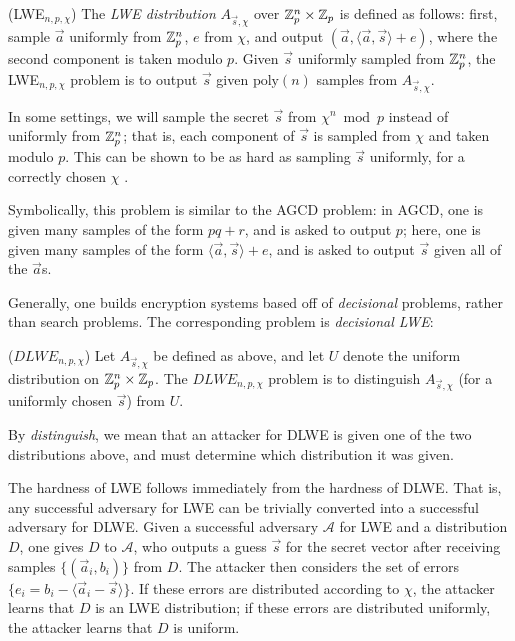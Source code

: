     \begin{definition} (LWE$_{n, p, \chi}$)
        The \emph{LWE distribution} $A_{\vec{s}, \chi}$ over $\mathbb{Z}_p^n \times \mathbb{Z}_p$ is defined as follows: first, sample $\vec{a}$ uniformly from $\mathbb{Z}_p^n$, $e$ from $\chi$, and output $(\vec{a}, \langle \vec{a}, \vec{s} \rangle + e)$, where the second component is taken modulo $p$.
        Given $\vec{s}$ uniformly sampled from $\mathbb{Z}_p^n$, the LWE$_{n, p, \chi}$ problem is to output $\vec{s}$ given $\text{poly}(n)$ samples from $A_{\vec{s}, \chi}$.
    \end{definition}

    In some settings, we will sample the secret $\vec{s}$ from $\chi^n \bmod p$ instead of uniformly from $\mathbb{Z}_p^n$; that is, each component of $\vec{s}$ is sampled from $\chi$ and taken modulo $p$. This can be shown to be as hard as sampling $\vec{s}$ uniformly, for a correctly chosen $\chi$ \cite{Peikertsurvey}.

    Symbolically, this problem is similar to the AGCD problem: in AGCD, one is given many samples of the form $pq + r$, and is asked to output $p$; here, one is given many samples of the form $\langle \vec{a}, \vec{s} \rangle + e$, and is asked to output $\vec{s}$ given all of the $\vec{a}$s.

    Generally, one builds encryption systems based off of \emph{decisional} problems, rather than search problems. The corresponding problem is \emph{decisional LWE}:
    \begin{definition} ($\textit{DLWE}_{n, p, \chi}$)
        Let $A_{\vec{s}, \chi}$ be defined as above, and let $U$ denote the uniform distribution on $\mathbb{Z}_p^n \times \mathbb{Z}_p$. The $\textit{DLWE}_{n, p, \chi}$ problem is to distinguish $A_{\vec{s}, \chi}$ (for a uniformly chosen $\vec{s}$) from $U$.
    \end{definition}

    By \emph{distinguish}, we mean that an attacker for DLWE is given one of the two distributions above, and must determine which distribution it was given.

    The hardness of LWE follows immediately from the hardness of DLWE.  That is, any successful adversary for LWE can be trivially converted into a successful adversary for DLWE. Given a successful adversary $\mathcal{A}$ for LWE and a distribution $D$, one gives $D$ to $\mathcal{A}$, who outputs a guess $\vec{s}$ for the secret vector after receiving samples $\{(\vec{a}_i, b_i)\}$ from $D$. The attacker then considers the set of errors $\{e_i = b_i - \langle \vec{a}_i - \vec{s} \rangle \}$. If these errors are distributed according to $\chi$, the attacker learns that $D$ is an LWE distribution; if these errors are distributed uniformly, the attacker learns that $D$ is uniform.

